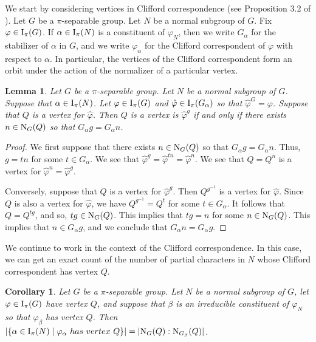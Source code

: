 \documentclass[12pt]{article}
\newtheorem{corollary}[theorem]{Corollary}
\newtheorem{lemma}[theorem]{Lemma}
\def\norm#1#2{{\textrm N}_{#1} (#2)}
\def\I#1#2{{\textrm I}_{#1} (#2)}
\def\Ipi#1{\I {\pi}{#1}}
\def\phi{\varphi}
\begin{document}
We start by considering vertices in Clifford correspondence (see
Proposition 3.2 of \cite{Fong}).  Let $G$ be a $\pi$-separable
group. Let $N$ be a normal subgroup of $G$.   Fix $\phi \in \Ipi G$.
If $\alpha \in \Ipi N$ is a constituent of $\phi_N$, then we write
$G_\alpha$ for the stabilizer of $\alpha$ in $G$, and we write
$\phi_\alpha$ for the Clifford correspondent of $\phi$ with respect
to $\alpha$. In particular, the vertices of the Clifford
correspondent form an orbit under the action of the normalizer of a
particular vertex.

\begin{lemma}\label{cliff}
Let $G$ be a $\pi$-separable group.  Let $N$ be a normal subgroup of
$G$.  Suppose that $\alpha \in \Ipi N$.  Let $\phi \in \Ipi G$ and
$\hat\phi \in \Ipi {G_\alpha}$ so that $\hat\phi^G = \phi$.  Suppose
that $Q$ is a vertex for $\hat\phi$.  Then $Q$ is a vertex is
$\hat\phi^g$ if and only if there exists $n \in \norm GQ$ so that
$G_\alpha g = G_\alpha n$.
\end{lemma}

\begin{proof}
We first suppose that there exists $n \in \norm GQ$ so that
$G_\alpha g = G_\alpha n$.  Thus, $g = tn$ for some $t \in
G_\alpha$.  We see that $\hat\phi^g = \hat\phi^{tn} = \hat\phi^n$.
We see that $Q = Q^n$ is a vertex for $\hat\phi^n = \hat\phi^g$.

Conversely, suppose that $Q$ is a vertex for $\hat\phi^g$.  Then
$Q^{g^{-1}}$ is a vertex for $\hat\phi$.  Since $Q$ is also a vertex
for $\hat\phi$, we have $Q^{g^{-1}} = Q^t$ for some $t \in
G_\alpha$.  It follows that $Q = Q^{tg}$, and so, $tg \in \norm GQ$.
This implies that $tg = n$ for some $n \in \norm GQ$.  This implies
that $n \in G_\alpha g$, and we conclude that $G_\alpha n = G_\alpha
g$.
\end{proof}

We continue to work in the context of the Clifford correspondence.
In this case, we can get an exact count of the number of partial
characters in $N$ whose Clifford correspondent has vertex $Q$.

\begin{corollary}\label{cliff count}
Let $G$ be a $\pi$-separable group.  Let $N$ be a normal subgroup of
$G$, let $\phi \in \Ipi G$ have vertex $Q$, and suppose that $\beta$
is an irreducible constituent of $\phi_N$ so that $\phi_\beta$ has
vertex $Q$. Then $|\{ \alpha \in \Ipi N \mid \phi_\alpha {\textrm ~
has~vertex~} Q \}| = |\norm GQ : \norm {G_\beta}Q|$.
\end{corollary}
\end{document}
